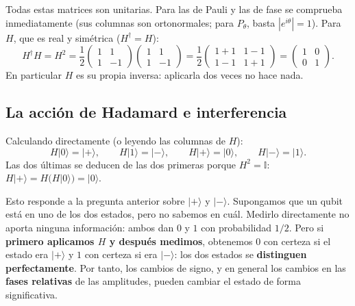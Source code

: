 \documentclass[11pt, a4paper, twoside, openright]{report}
\begin{document}
\noindent Todas estas matrices son unitarias. Para las de Pauli y las de fase se comprueba inmediatamente (sus columnas son ortonormales; para $P_\theta$, basta $|e^{i\theta}| = 1$). Para $H$, que es real y simétrica ($H^\dagger = H$):
\[
H^\dagger H = H^2 = \frac12\begin{pmatrix} 1 & 1 \\ 1 & -1 \end{pmatrix}\begin{pmatrix} 1 & 1 \\ 1 & -1 \end{pmatrix} = \frac12\begin{pmatrix} 1+1 & 1-1 \\ 1-1 & 1+1 \end{pmatrix} = \begin{pmatrix} 1 & 0 \\ 0 & 1 \end{pmatrix}.
\]
En particular $H$ es su propia inversa: aplicarla dos veces no hace nada.

\subsection{La acción de Hadamard e interferencia}

\noindent Calculando directamente (o leyendo las columnas de $H$):
\[
H|0\rangle = |+\rangle, \qquad H|1\rangle = |-\rangle, \qquad H|+\rangle = |0\rangle, \qquad H|-\rangle = |1\rangle.
\]
Las dos últimas se deducen de las dos primeras porque $H^2 = \mathbb{I}$: $H|+\rangle = H(H|0\rangle) = |0\rangle$.

\noindent Esto responde a la pregunta anterior sobre $|+\rangle$ y $|-\rangle$. Supongamos que un qubit está en uno de los dos estados, pero no sabemos en cuál. Medirlo directamente no aporta ninguna información: ambos dan $0$ y $1$ con probabilidad $1/2$. Pero si \textbf{primero aplicamos $H$ y después medimos}, obtenemos $0$ con certeza si el estado era $|+\rangle$ y $1$ con certeza si era $|-\rangle$: los dos estados se \textbf{distinguen perfectamente}. Por tanto, los cambios de signo, y en general los cambios en las \textbf{fases relativas} de las amplitudes, pueden cambiar el estado de forma significativa.
\end{document}
